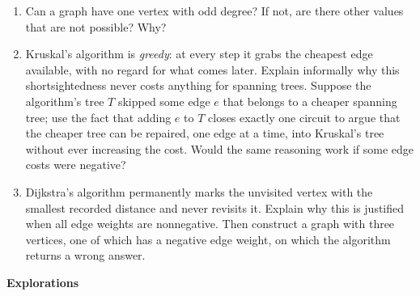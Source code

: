 \begin{enumerate}[start=15]
\item Can a graph have one vertex with odd degree?  If not, are there other values that are not possible?  Why?\\

\item \label{ex:mst-greedy}Kruskal's algorithm is \emph{greedy}: at every step it grabs the cheapest edge available, with no regard for what comes later.  Explain informally why this shortsightedness never costs anything for spanning trees.  Suppose the algorithm's tree $T$ skipped some edge $e$ that belongs to a cheaper spanning tree; use the fact that adding $e$ to $T$ closes exactly one circuit to argue that the cheaper tree can be repaired, one edge at a time, into Kruskal's tree without ever increasing the cost.  Would the same reasoning work if some edge costs were negative?
\exrefs{\S\ref{subsec:gt-kruskal}}

\item \label{ex:dijkstra-nonneg}Dijkstra's algorithm permanently marks the unvisited vertex with the smallest recorded distance and never revisits it.  Explain why this is justified when all edge weights are nonnegative.  Then construct a graph with three vertices, one of which has a negative edge weight, on which the algorithm returns a wrong answer.
\exrefs{\S\ref{sec:gt-shortest-path}}

\end{enumerate}

\noindent \textbf{Explorations}

